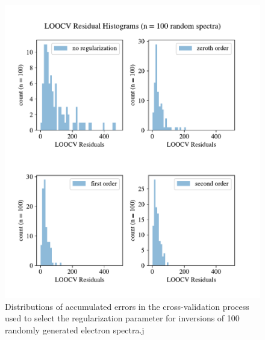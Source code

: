 \begin{figure}[p]
    \centering
    \includegraphics[width=\textwidth]{figures/chapter_4/loocv_histograms/loocv_histograms.pdf}
    \caption{Distributions of accumulated errors in the cross-validation process used to select the regularization parameter for inversions of 100 randomly generated electron spectra.j}
    \label{why_non_negative_is_good}
\end{figure}
